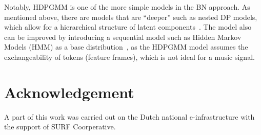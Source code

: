 \documentclass{article}
\begin{document}
Notably, HDPGMM is one of the more simple models in the BN approach. As mentioned above, there are models that are ``deeper'' such as nested DP models, which allow for a hierarchical structure of latent components~\cite{DBLP:journals/pami/PaisleyWBJ15}. The model also can be improved by introducing a sequential model such as Hidden Markov Models (HMM) as a base distribution~\cite{DBLP:conf/icassp/QiPC07}, as the HDPGMM model assumes the exchangeability of tokens (feature frames), which is not ideal for a music signal.


\section{Acknowledgement}\label{sec:ack}

A part of this work was carried out on the Dutch national e-infrastructure with the support of SURF Coorperative. 


\end{document}
